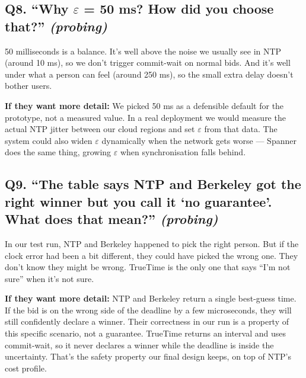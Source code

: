 \documentclass[a4paper,11pt]{article}
\begin{document}
\subsection{Q8. ``Why \texorpdfstring{$\varepsilon$}{epsilon} = 50 ms? How did you choose that?'' \textnormal{\small\itshape (probing)}}

\begin{shortans}
50 milliseconds is a balance. It's well above the noise we
usually see in NTP (around 10 ms), so we don't trigger commit-wait
on normal bids. And it's well under what a person can feel
(around 250 ms), so the small extra delay doesn't bother users.
\end{shortans}

\begin{deepans}
\textbf{If they want more detail:} We picked 50 ms as a defensible
default for the prototype, not a measured value. In a real
deployment we would measure the actual NTP jitter between our
cloud regions and set $\varepsilon$ from that data. The system
could also widen $\varepsilon$ dynamically when the network gets
worse --- Spanner does the same thing, growing $\varepsilon$ when
synchronisation falls behind.
\end{deepans}

\subsection{Q9. ``The table says NTP and Berkeley got the right winner but you call it `no guarantee'. What does that mean?'' \textnormal{\small\itshape (probing)}}

\begin{shortans}
In our test run, NTP and Berkeley happened to pick the right
person. But if the clock error had been a bit different, they
could have picked the wrong one. They don't know they might be
wrong. TrueTime is the only one that says ``I'm not sure'' when
it's not sure.
\end{shortans}

\begin{deepans}
\textbf{If they want more detail:} NTP and Berkeley return a
single best-guess time. If the bid is on the wrong side of the
deadline by a few microseconds, they will still confidently
declare a winner. Their correctness in our run is a property of
this specific scenario, not a guarantee. TrueTime returns an
interval and uses commit-wait, so it never declares a winner
while the deadline is inside the uncertainty. That's the safety
property our final design keeps, on top of NTP's cost profile.
\end{deepans}
\end{document}
